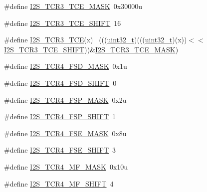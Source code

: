 \begin{DoxyCompactItemize}
\item 
\#define \hyperlink{group___i2_s___register___masks_ga27bcb7b4d391b96f7fd8f566579bf7e2}{I2\+S\+\_\+\+T\+C\+R3\+\_\+\+T\+C\+E\+\_\+\+M\+A\+SK}~0x30000u
\item 
\#define \hyperlink{group___i2_s___register___masks_gab6791fd5b9271db39f4f91173ed3c30d}{I2\+S\+\_\+\+T\+C\+R3\+\_\+\+T\+C\+E\+\_\+\+S\+H\+I\+FT}~16
\item 
\#define \hyperlink{group___i2_s___register___masks_gae0bab25830b011173c849e48f0f3f717}{I2\+S\+\_\+\+T\+C\+R3\+\_\+\+T\+CE}(x)                                                ~(((\hyperlink{_p_e___types_8h_a33594304e786b158f3fb30289278f5af}{uint32\+\_\+t})(((\hyperlink{_p_e___types_8h_a33594304e786b158f3fb30289278f5af}{uint32\+\_\+t})(x))$<$$<$\hyperlink{group___i2_s___register___masks_gab6791fd5b9271db39f4f91173ed3c30d}{I2\+S\+\_\+\+T\+C\+R3\+\_\+\+T\+C\+E\+\_\+\+S\+H\+I\+FT}))\&\hyperlink{group___i2_s___register___masks_ga27bcb7b4d391b96f7fd8f566579bf7e2}{I2\+S\+\_\+\+T\+C\+R3\+\_\+\+T\+C\+E\+\_\+\+M\+A\+SK})
\item 
\#define \hyperlink{group___i2_s___register___masks_ga895aea8d5cc09529dfca99dc5c511644}{I2\+S\+\_\+\+T\+C\+R4\+\_\+\+F\+S\+D\+\_\+\+M\+A\+SK}~0x1u
\item 
\#define \hyperlink{group___i2_s___register___masks_ga61e4999938fd48b7f2f316e1563277ec}{I2\+S\+\_\+\+T\+C\+R4\+\_\+\+F\+S\+D\+\_\+\+S\+H\+I\+FT}~0
\item 
\#define \hyperlink{group___i2_s___register___masks_ga040aed413399e30e47219d040ff46c9d}{I2\+S\+\_\+\+T\+C\+R4\+\_\+\+F\+S\+P\+\_\+\+M\+A\+SK}~0x2u
\item 
\#define \hyperlink{group___i2_s___register___masks_ga48dba321e9103f28b6b66b072dae99b7}{I2\+S\+\_\+\+T\+C\+R4\+\_\+\+F\+S\+P\+\_\+\+S\+H\+I\+FT}~1
\item 
\#define \hyperlink{group___i2_s___register___masks_ga1431c095df0a4ca821052d83ca72ca96}{I2\+S\+\_\+\+T\+C\+R4\+\_\+\+F\+S\+E\+\_\+\+M\+A\+SK}~0x8u
\item 
\#define \hyperlink{group___i2_s___register___masks_ga967f80d877a02e10cfe3041c0547c67f}{I2\+S\+\_\+\+T\+C\+R4\+\_\+\+F\+S\+E\+\_\+\+S\+H\+I\+FT}~3
\item 
\#define \hyperlink{group___i2_s___register___masks_ga3331c691867adbb231a8d1d7ccb4ce94}{I2\+S\+\_\+\+T\+C\+R4\+\_\+\+M\+F\+\_\+\+M\+A\+SK}~0x10u
\item 
\#define \hyperlink{group___i2_s___register___masks_ga63d02d7aac86c3c6389035e2e3a8a96b}{I2\+S\+\_\+\+T\+C\+R4\+\_\+\+M\+F\+\_\+\+S\+H\+I\+FT}~4
$$
\end{DoxyCompactItemize}
